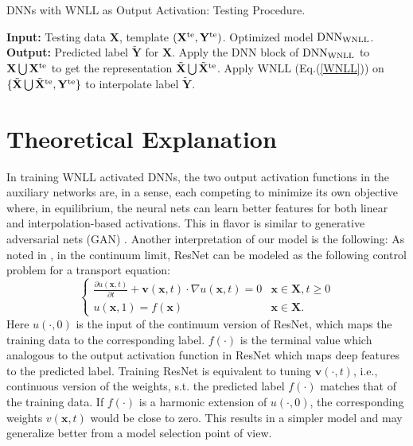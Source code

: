 \documentclass{article}
\begin{document}


\begin{algorithm}
\caption{DNNs with WNLL as Output Activation: Testing Procedure.}\label{alg-Test}
\begin{algorithmic}
\State \textbf{Input: } Testing data $\mathbf{X}$, template $(\mathbf{X}^{\rm te}, \mathbf{Y}^{\rm te})$. Optimized model ${\rm DNN}_{\rm WNLL}$.
\State \textbf{Output: } Predicted label $\tilde{\mathbf{Y}}$ for $\mathbf{X}$.
\State Apply the DNN block of ${\rm DNN}_{\rm WNLL}$ to $\mathbf{X}\bigcup \mathbf{X}^{\rm te}$ to get the representation $\tilde{\mathbf{X}}\bigcup \tilde{\mathbf{X}}^{\rm te}$.
\State Apply WNLL (Eq.(\ref{WNLL})) on $\{\tilde{\mathbf{X}} \bigcup \tilde{\mathbf{X}}^{\rm te}, \mathbf{Y}^{\rm te}\}$ to interpolate label $\tilde{\mathbf{Y}}$.
\end{algorithmic}
\end{algorithm}

\section{Theoretical Explanation}
\label{sec:Theory}
In training WNLL activated DNNs, the two output activation functions in the auxiliary networks are, in a sense, each competing to minimize its own objective where, in equilibrium, the neural nets can learn better features for both linear and interpolation-based activations. This in flavor is similar to generative adversarial nets (GAN) \cite{GAN}.
Another interpretation of our model is the following: As noted in  \cite{ResNet:PDE}, in the continuum limit, ResNet can be modeled as the following control problem for a transport equation:
\begin{equation}
\label{Linear-Transport}
\begin{cases}
\frac{\partial u(\mathbf{x}, t)}{\partial t}+\mathbf{v}(\mathbf{x}, t)\cdot \nabla u(\mathbf{x}, t)=0 & \mathbf{x}\in \mathbf{X}, t\geq 0\\
u(\mathbf{x}, 1)=f\left(\mathbf{x}\right) &\mathbf{x}\in \mathbf{X}.
\end{cases}
\end{equation}
Here $u(\cdot, 0)$ is the input of the continuum version of ResNet, which maps the training data to the corresponding label. $f(\cdot)$ is the terminal value which analogous to the output activation function in ResNet which maps deep features to the predicted label. Training ResNet is equivalent to tuning $\mathbf{v}(\cdot, t)$, i.e., continuous version of the weights, s.t. the predicted label $f(\cdot)$ matches that of the training data. If $f(\cdot)$ is a harmonic extension of $u(\cdot, 0)$, the corresponding weights $v(\mathbf{x}, t)$ would be close to zero. This results in a simpler model and may generalize better from a model selection point of view.
\end{document}
